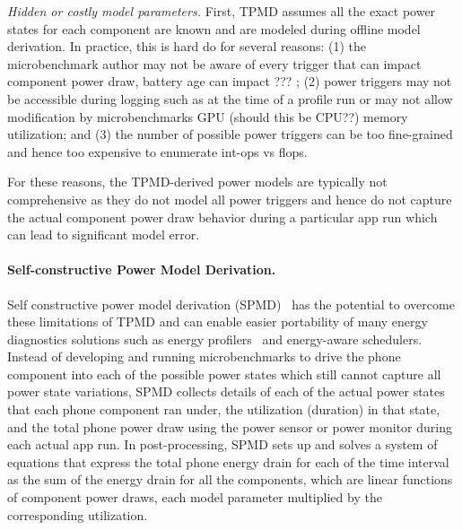 {{\it Hidden or costly model parameters.}
First, TPMD assumes all the exact power states for each component are known and are modeled during offline model derivation. In practice, this is hard do for several reasons:
(1) the microbenchmark author may not be aware of every trigger that can impact component power draw, \eg battery age can impact ??? ;
(2) power triggers may not be accessible during logging such as at the time of a profile run or may not allow modification by microbenchmarks \eg GPU
(should this be CPU??) memory utilization; and
(3) the number of possible power triggers can be too fine-grained and hence too expensive to enumerate \eg int-ops vs flops.
%

For these reasons, the TPMD-derived power models 
are typically not comprehensive as they do not model all power triggers and hence
do not capture the actual component power draw behavior during a particular app run
which can lead to significant model error. 
}


\paragraph{Self-constructive Power Model Derivation.}
\label{subsec:spmd}
%
Self constructive power model derivation (SPMD)~\cite{dong2011self} 
has the potential to overcome 
these limitations of TPMD and can enable easier portability of 
many energy diagnostics solutions such as energy profilers~\cite{flinn:1999,shye2009into,zhang2010accurate,sesame:2011,pathak2012energy,appscope,ding2017gfxdoctor,facebookbatterymetrics} and energy-aware schedulers.
Instead of developing and running microbenchmarks to drive the 
phone component into each of the possible power states
which still cannot capture
all power state variations, SPMD collects details of each of the 
actual power states that each phone component ran under, the 
utilization (duration) in that state, and the total phone power draw 
using the power sensor or power monitor  during each actual 
app run. In post-processing, SPMD sets up and solves a system of equations 
that express the total phone energy drain for each of the time 
interval as the sum of the energy drain for all the components, which 
are linear functions of component power draws, 
\ie each model parameter multiplied by the corresponding utilization.

